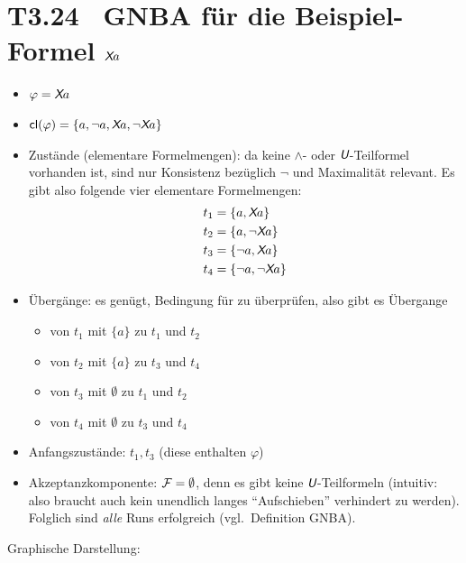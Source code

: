 \documentclass[fontsize=11pt, twoside=false, numbers=autoenddot]{scrbook}
\begin{document}
\section*{{\boldmath T3.24~ GNBA für die Beispiel-Formel $\textit{\textsf{X}} a$}}

\begin{itemize}
  \item
    $\varphi = \textit{\textsf{X}} a$
  \item
    $\textsf{cl}(\varphi) = \{a, \lnot a, \textit{\textsf{X}} a, \lnot \textit{\textsf{X}} a\}$
  \item
    Zustände (elementare Formelmengen): da keine $\land$- oder $\mathbin{\textit{\textsf{U}}}$-Teilformel vorhanden ist,
    sind nur Konsistenz bezüglich $\lnot$ und Maximalität relevant.
    Es gibt also folgende vier elementare Formelmengen:
    \begin{align*}
      t_1 & = \{a,\textit{\textsf{X}} a\} \\
      t_2 & = \{a,\lnot\textit{\textsf{X}} a\} \\
      t_3 & = \{\lnot a,\textit{\textsf{X}} a\} \\
      t_4 & = \{\lnot a,\lnot\textit{\textsf{X}} a\}
    \end{align*}
  \item
    Übergänge: es genügt, Bedingung  für \X zu überprüfen,
    also gibt es Übergange
    \begin{itemize}
      \item
        von $t_1$ mit $\{a\}$ zu $t_1$ und $t_2$
      \item
        von $t_2$ mit $\{a\}$ zu $t_3$ und $t_4$
      \item
        von $t_3$ mit $\emptyset$ zu $t_1$ und $t_2$
      \item
        von $t_4$ mit $\emptyset$ zu $t_3$ und $t_4$
    \end{itemize}
  \item
    Anfangszustände: $t_1,t_3$ (diese enthalten $\varphi$)
  \item
    Akzeptanzkomponente: $\mathcal{F} = \emptyset$,
    denn es gibt keine $\mathbin{\textit{\textsf{U}}}$-Teilformeln
    (intuitiv: also braucht auch kein unendlich langes "`Aufschieben"'
    verhindert zu werden). Folglich sind \emph{alle} Runs erfolgreich
    (vgl.\ Definition GNBA).
\end{itemize}
%
Graphische Darstellung:
%
\end{document}
